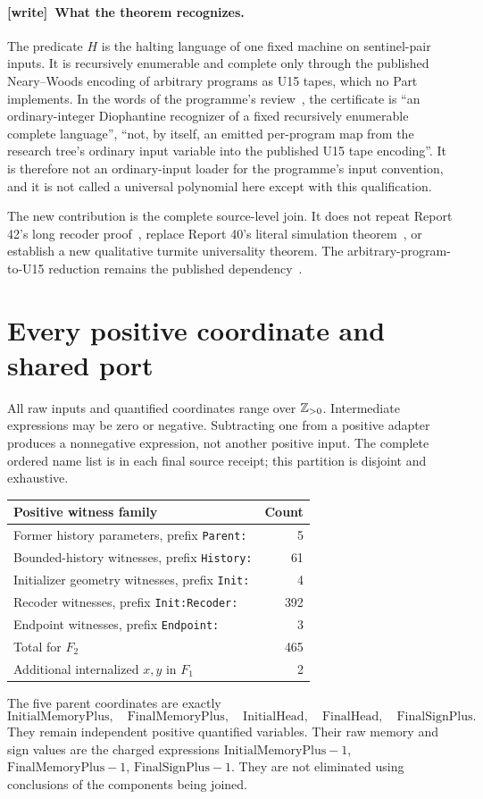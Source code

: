 \documentclass[11pt,letterpaper]{article}
\theoremstyle{definition}\newtheorem{definition}[theorem]{Definition}
\theoremstyle{remark}\newtheorem{remark}[theorem]{Remark}
\newcommand{\codeu}[1]{\nolinkurl{#1}}
\newcommand{\IM}{\mathrm{InitialMemoryPlus}}\newcommand{\IH}{\mathrm{InitialHead}}
\newcommand{\FM}{\mathrm{FinalMemoryPlus}}\newcommand{\FH}{\mathrm{FinalHead}}
\newcommand{\FS}{\mathrm{FinalSignPlus}}
\newcommand{\wtag}{\textup{[write]}}
\begin{document}
\paragraph{\wtag\ What the theorem recognizes.} The predicate $H$ is the
halting language of one fixed machine on sentinel-pair inputs. It is
recursively enumerable and complete only through the published Neary--Woods
encoding of arbitrary programs as U15 tapes, which no Part implements. In the
words of the programme's review~\cite{ptr:w:rev4048}, the certificate is ``an
ordinary-integer Diophantine recognizer of a fixed recursively enumerable
complete language'', ``not, by itself, an emitted per-program map from the
research tree's ordinary input variable into the published U15 tape
encoding''. It is therefore not an ordinary-input loader for the programme's
input convention, and it is not called a universal polynomial here except
with this qualification.

The new contribution is the complete source-level join. It does not repeat Report 42's long recoder proof~\cite{ptr:pc:report42}, replace Report 40's literal simulation theorem~\cite{ptr:pc:report40}, or establish a new qualitative turmite universality theorem. The arbitrary-program-to-U15 reduction remains the published dependency~\cite{ptr:pc:nw}.

\section{Every positive coordinate and shared port}\label{ptr:pc:sec:ports}
All raw inputs and quantified coordinates range over $\mathbb Z_{>0}$. Intermediate expressions may be zero or negative. Subtracting one from a positive adapter produces a nonnegative expression, not another positive input. The complete ordered name list is in each final source receipt; this partition is disjoint and exhaustive.
\begin{center}
\begin{tabular}{@{}lr@{}}\toprule
Positive witness family & Count\\\midrule
Former history parameters, prefix \codeu{Parent:} &5\\
Bounded-history witnesses, prefix \codeu{History:}&61\\
Initializer geometry witnesses, prefix \codeu{Init:}&4\\
Recoder witnesses, prefix \codeu{Init:Recoder:}&392\\
Endpoint witnesses, prefix \codeu{Endpoint:}&3\\\midrule
Total for $F_2$&465\\
Additional internalized $x,y$ in $F_1$&2\\\bottomrule
\end{tabular}\end{center}
The five parent coordinates are exactly
\[
 \IM,\quad\FM,\quad\IH,\quad\FH,\quad\FS.
\]
They remain independent positive quantified variables. Their raw memory and sign values are the charged expressions $\IM-1$, $\FM-1$, $\FS-1$. They are not eliminated using conclusions of the components being joined.
\end{document}
